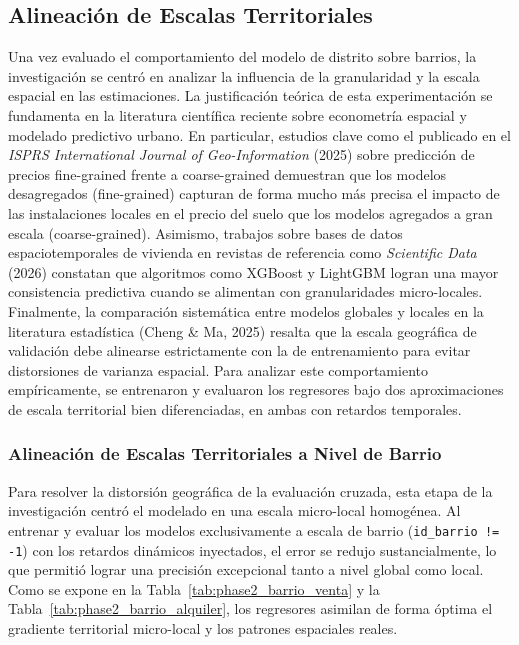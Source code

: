 \documentclass[a4paper,11pt,openany]{book}
\begin{document}
\subsection{Alineación de Escalas Territoriales}
Una vez evaluado el comportamiento del modelo de distrito sobre barrios, la investigación se centró en analizar la influencia de la granularidad y la escala espacial en las estimaciones. La justificación teórica de esta experimentación se fundamenta en la literatura científica reciente sobre econometría espacial y modelado predictivo urbano. En particular, estudios clave como el publicado en el \textit{ISPRS International Journal of Geo-Information} (2025) sobre predicción de precios fine-grained frente a coarse-grained demuestran que los modelos desagregados (fine-grained) capturan de forma mucho más precisa el impacto de las instalaciones locales en el precio del suelo que los modelos agregados a gran escala (coarse-grained). Asimismo, trabajos sobre bases de datos espaciotemporales de vivienda en revistas de referencia como \textit{Scientific Data} (2026) constatan que algoritmos como XGBoost y LightGBM logran una mayor consistencia predictiva cuando se alimentan con granularidades micro-locales. Finalmente, la comparación sistemática entre modelos globales y locales en la literatura estadística (Cheng \& Ma, 2025) resalta que la escala geográfica de validación debe alinearse estrictamente con la de entrenamiento para evitar distorsiones de varianza espacial. Para analizar este comportamiento empíricamente, se entrenaron y evaluaron los regresores bajo dos aproximaciones de escala territorial bien diferenciadas, en ambas con retardos temporales.

\subsubsection{Alineación de Escalas Territoriales a Nivel de Barrio}
Para resolver la distorsión geográfica de la evaluación cruzada, esta etapa de la investigación centró el modelado en una escala micro-local homogénea. Al entrenar y evaluar los modelos exclusivamente a escala de barrio (\texttt{id\_barrio != -1}) con los retardos dinámicos inyectados, el error se redujo sustancialmente, lo que permitió lograr una precisión excepcional tanto a nivel global como local. Como se expone en la Tabla~\ref{tab:phase2_barrio_venta} y la Tabla~\ref{tab:phase2_barrio_alquiler}, los regresores asimilan de forma óptima el gradiente territorial micro-local y los patrones espaciales reales.
\end{document}
